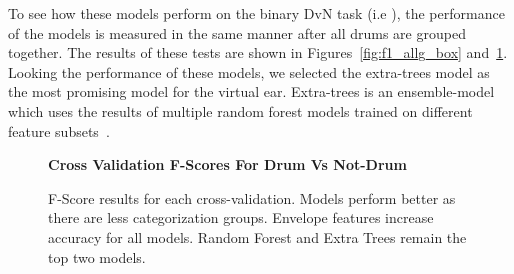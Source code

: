 \documentclass[\main/thesis.tex]{subfiles}
\begin{document}
To see how these models perform on the binary DvN task (i.e \decfirst), the performance of the models is measured in the same manner after all drums are grouped together. The results of these tests are shown in Figures~\ref{fig:f1_allg_box} and~\ref{fig:f1_dvn_box}. Looking the performance of these models, we selected the extra-trees model as the most promising model for the virtual ear. Extra-trees is an ensemble-model which uses the results of multiple random forest models trained on different feature subsets~\cite{geurts2006extremely,pedregosa2011scikit}.

\begin{figure}[htbp]   
    \begin{center}
        \textbf{Cross Validation F-Scores For Drum Vs Not-Drum}
    \caption{F-Score results for each cross-validation. Models perform better as there are less categorization groups. Envelope features increase accuracy for all models. Random Forest and Extra Trees remain the top two models. }
    \label{fig:f1_dvn_box}
    \end{center}
\end{figure}
\end{document}

